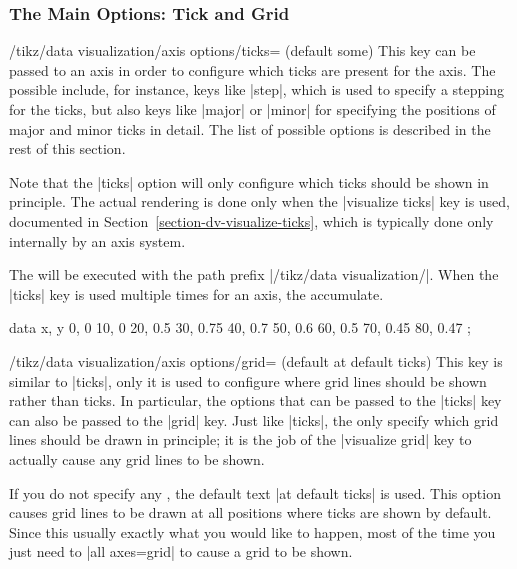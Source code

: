 \subsubsection{The Main Options: Tick and Grid}

\begin{key}{/tikz/data visualization/axis options/ticks=
  (default some)}
  This key can be passed to an axis in order to configure which ticks
  are present for the axis. The possible  include, for
  instance, keys like |step|, which is used to specify a stepping for
  the ticks, but also keys like |major| or |minor| for specifying the
  positions of major and minor ticks in detail. The list of possible
  options is described in the rest of this section.

  Note that the |ticks| option will only configure which ticks should
  be shown in principle. The actual rendering is done only when the
  |visualize ticks| key is used, documented in
  Section~\ref{section-dv-visualize-ticks}, which is typically done
  only internally by an axis system.

  The  will be executed with the path prefix
  |/tikz/data visualization/|. When the |ticks| key is used multiple
  times for an axis, the  accumulate.
\begin{codeexample}[width=6cm]
\tikz \datavisualization [
  scientific axes, visualize as line,
  x axis={ticks={step=24, minor steps between steps=3},
          label=hours}]
  data {
    x, y
    0, 0
    10, 0
    20, 0.5
    30, 0.75
    40, 0.7
    50, 0.6
    60, 0.5
    70, 0.45
    80, 0.47
  };
\end{codeexample}
\end{key}

\begin{key}{/tikz/data visualization/axis options/grid=
    (default at default ticks)}
  This key is similar to |ticks|, only it is used to configure where
  grid lines should be shown rather than ticks. In particular, the
  options that can be passed to the |ticks| key can also be passed to
  the |grid| key. Just like |ticks|, the  only specify
  which grid lines should be drawn in principle; it is the job of the
  |visualize grid| key to actually cause any grid lines to be shown.

  If you do not specify any , the default text
  |at default ticks| is used. This option causes grid lines to be
  drawn at all positions where ticks are shown by default. Since this
  usually exactly what you would like to happen, most of the time you
  just need to |all axes=grid| to cause a grid to be shown.
\end{key}

